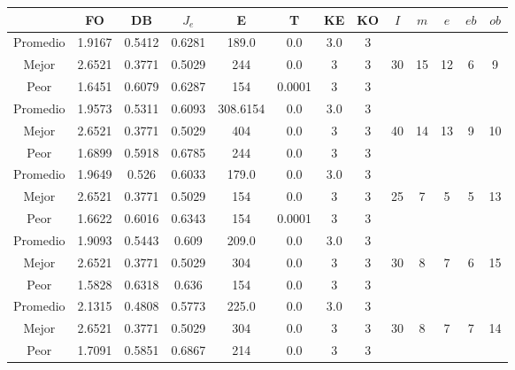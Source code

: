 \begin{table}[h!]
    \footnotesize
    \begin{center}
        \begin{tabular}{|c|c|c|c|c|c|c|c|c|c|c|c|c|}
        \hline
            & {\bf FO} & {\bf DB} & $J_e$ & {\bf E} & {\bf T} & {\bf KE} & {\bf KO} & $I$ & $m$ & $e$ & $eb$ & $ob$ \\
        \hline
        \hline
            Promedio  & 1.9167 & 0.5412 & 0.6281 & 189.0 & 0.0 & 3.0 & 3 &  &  &  &  & \\
            \cline{1-8}
            Mejor & 2.6521 & 0.3771  & 0.5029 & 244 & 0.0 & 3 & 3 & 30 & 15 & 12 & 6 & 9\\
            \cline{1-8}
            Peor & 1.6451 & 0.6079  & 0.6287 & 154 & 0.0001 & 3 & 3 &  &  &  &  & \\
        \hline
        \hline
            Promedio  & 1.9573 & 0.5311 & 0.6093 & 308.6154 & 0.0 & 3.0 & 3 &  &  &  &  & \\
            \cline{1-8}
            Mejor & 2.6521 & 0.3771  & 0.5029 & 404 & 0.0 & 3 & 3 & 40 & 14 & 13 & 9 & 10\\
            \cline{1-8}
            Peor & 1.6899 & 0.5918  & 0.6785 & 244 & 0.0 & 3 & 3 &  &  &  &  & \\
        \hline
        \hline
            Promedio  & 1.9649 & 0.526 & 0.6033 & 179.0 & 0.0 & 3.0 & 3 &  &  &  &  & \\
            \cline{1-8}
            Mejor & 2.6521 & 0.3771  & 0.5029 & 154 & 0.0 & 3 & 3 & 25 & 7 & 5 & 5 & 13\\
            \cline{1-8}
            Peor & 1.6622 & 0.6016  & 0.6343 & 154 & 0.0001 & 3 & 3 &  &  &  &  & \\
        \hline
        \hline
            Promedio  & 1.9093 & 0.5443 & 0.609 & 209.0 & 0.0 & 3.0 & 3 &  &  &  &  & \\
            \cline{1-8}
            Mejor & 2.6521 & 0.3771  & 0.5029 & 304 & 0.0 & 3 & 3 & 30 & 8 & 7 & 6 & 15\\
            \cline{1-8}
            Peor & 1.5828 & 0.6318  & 0.636 & 154 & 0.0 & 3 & 3 &  &  &  &  & \\
        \hline
        \hline
            Promedio  & 2.1315 & 0.4808 & 0.5773 & 225.0 & 0.0 & 3.0 & 3 &  &  &  &  & \\
            \cline{1-8}
            Mejor & 2.6521 & 0.3771  & 0.5029 & 304 & 0.0 & 3 & 3 & 30 & 8 & 7 & 7 & 14\\
            \cline{1-8}
            Peor & 1.7091 & 0.5851  & 0.6867 & 214 & 0.0 & 3 & 3 &  &  &  &  & \\

\end{tabular}
\end{center}
\end{table}
